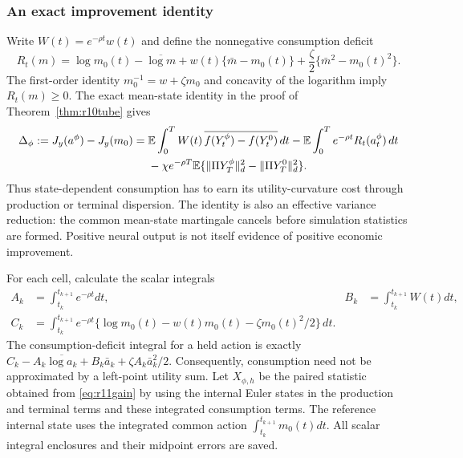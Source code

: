 \subsubsection{An exact improvement identity}
Write $W(t)=e^{-\rho t}w(t)$ and define the nonnegative consumption deficit
\begin{equation}\label{eq:r11deficit}
 R_t(m)=\log m_0(t)-\overline{\log m}
       +w(t)\{\bar m-m_0(t)\}
       +\frac\zeta2\{\bar m^2-m_0(t)^2\}.
\end{equation}
The first-order identity $m_0^{-1}=w+\zeta m_0$ and concavity of the logarithm imply $R_t(m)\geq0$. The exact mean-state identity in the proof of Theorem~\ref{thm:r10tube} gives
\begin{align}
 \Delta_\phi:=J_y(a^\phi)-J_y(m_0)
 ={}&\mathbb E\int_0^T W(t)\,\overline{f(Y^\phi_t)-f(Y^0_t)}\,dt
       -\mathbb E\int_0^T e^{-\rho t}R_t(a^\phi_t)\,dt\notag\\
 &-\chi e^{-\rho T}\mathbb E\{\|\Pi Y^\phi_T\|_d^2-\|\Pi Y^0_T\|_d^2\}.
 \label{eq:r11gain}
\end{align}
Thus state-dependent consumption has to earn its utility-curvature cost through production or terminal dispersion. The identity is also an effective variance reduction: the common mean-state martingale cancels before simulation statistics are formed. Positive neural output is not itself evidence of positive economic improvement.

For each cell, calculate the scalar integrals
\begin{align*}
 A_k&=\int_{t_k}^{t_{k+1}}e^{-\rho t}dt,&
 B_k&=\int_{t_k}^{t_{k+1}}W(t)dt,\\
 C_k&=\int_{t_k}^{t_{k+1}}e^{-\rho t}
       \{\log m_0(t)-w(t)m_0(t)-\zeta m_0(t)^2/2\}\,dt.
\end{align*}
The consumption-deficit integral for a held action is exactly
$C_k-A_k\overline{\log a_k}+B_k\bar a_k+\zeta A_k\bar a_k^2/2$.
Consequently, consumption need not be approximated by a left-point utility sum. Let $X_{\phi,h}$ be the paired statistic obtained from \eqref{eq:r11gain} by using the internal Euler states in the production and terminal terms and these integrated consumption terms. The reference internal state uses the integrated common action $\int_{t_k}^{t_{k+1}}m_0(t)dt$. All scalar integral enclosures and their midpoint errors are saved.


